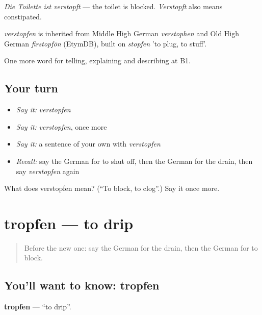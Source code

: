\emph{Die Toilette ist verstopft} — the toilet is blocked. \emph{Verstopft} also means constipated.

\begin{cousinweb}
\emph{verstopfen} is inherited from Middle High German \emph{verstophen} and Old High German \emph{firstopfōn} (EtymDB), built on \emph{stopfen} 'to plug, to stuff'.
\end{cousinweb}

\begin{grammarlens}[title={What you've built}]
One more word for telling, explaining and describing at B1.
\end{grammarlens}

\subsection*{Your turn}
\begin{itemize}
\raggedright
  \item \emph{Say it:} \emph{verstopfen}
  \item \emph{Say it:} \emph{verstopfen}, once more
  \item \emph{Say it:} a sentence of your own with \emph{verstopfen}
  \item \emph{Recall:} say the German for to shut off, then the German for the drain, then say \emph{verstopfen} again
\end{itemize}

\begin{tcolorbox}[breakable,colback=teal!4,colframe=teal!35!black,title={Before you move on}]
What does verstopfen mean? (\textquotedblleft{}To block, to clog\textquotedblright{}.) Say it once more.
\end{tcolorbox}
\section[tropfen]{tropfen — to drip}

\label{lesson:GE-C428-tropfen}



\begin{quote}
Before the new one: say the German for the drain, then the German for to block.
\end{quote}

\subsection*{You'll want to know: tropfen}
\textbf{tropfen} — \textquotedblleft{}to drip\textquotedblright{}.

